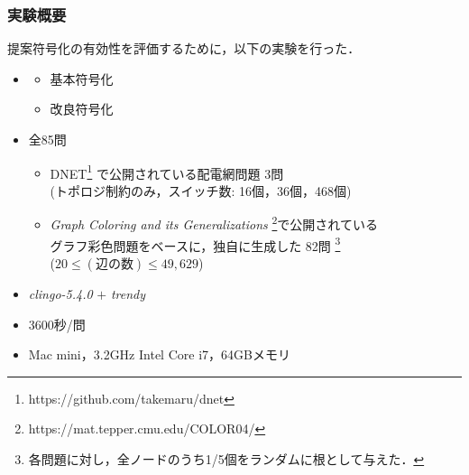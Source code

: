 \documentclass[dvipdfmx,11pt]{beamer}
\begin{document}
\begin{frame}\frametitle{実験概要}
\renewcommand{\thefootnote}{\fnsymbol{footnote}}
\setcounter{footnote}{1}
提案符号化の有効性を評価するために，以下の実験を行った．

\begin{itemize}
 \item {}
	   \begin{itemize}
		\item 基本符号化
		\item 改良符号化
	   \end{itemize}
 \item {} 全85問
	   \begin{itemize}
		\item DNET\footnote{https://github.com/takemaru/dnet}%
			  で公開されている配電網問題 3問 \\ (トポロジ制約のみ，スイッチ数: 16個，36個，468個)
		\item \textit{Graph Coloring and its Generalizations}
			  \footnote{https://mat.tepper.cmu.edu/COLOR04/}で公開されている \\
			  グラフ彩色問題をベースに，独自に生成した 82問 
			  \footnote{各問題に対し，全ノードのうち1/5個をランダムに根として与えた．}\\
			  ($20 \leq (\textbf{辺の数}) \leq 49,629$)
	   \end{itemize}
 \item {} \textit{clingo-5.4.0} $+$ \textit{trendy}
 \item {} 3600秒/問
 \item {} Mac mini，3.2GHz Intel Core i7，64GBメモリ
\end{itemize}

\end{frame}
\end{document}
